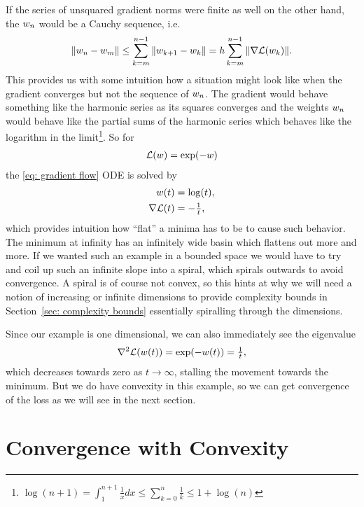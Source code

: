 If the series of unsquared gradient norms were finite as well on the other hand,
the \(w_n\) would be a Cauchy sequence, i.e.
%
\begin{align*}
	\|w_n - w_m \|
	\le \sum_{k=m}^{n-1} \|w_{k+1} - w_k\|
	= h \sum_{k=m}^{n-1} \|\nabla \mathcal{L}(w_k)\|.
\end{align*}
%
This provides us with some intuition how a situation might look like when the
gradient converges but not the sequence of \(w_n\). The gradient would
behave something like the harmonic series as its squares converges and the weights
\(w_n\) would behave like the partial sums of the harmonic series which
behaves like the logarithm in the limit\footnote{
\(
	\log(n+1) = \int_1^{n+1} \tfrac{1}x dx \le \sum_{k=0}^n \tfrac1k \le 1+ \log(n)
\)
}.
So for
%
\begin{align*}
	\mathcal{L}(w) = \exp(-w)
\end{align*}
%
the \ref{eq: gradient flow} ODE is solved by
%
\begin{align*}
	w(t) &= \log(t),\\
	\nabla \mathcal{L}(t) &= -\tfrac1t,
\end{align*}
%
which provides intuition how ``flat'' a minima has to be to cause such behavior.
The minimum at infinity has an infinitely wide basin which flattens out
more and more. If we wanted such an example in a bounded space we would have
to try and coil up such an infinite slope into a spiral, which spirals outwards
to avoid convergence. A spiral is of course not convex, so this hints
at why we will need a notion of increasing or infinite dimensions to
provide complexity bounds in Section~\ref{sec: complexity bounds} essentially
spiralling through the dimensions.

Since our example is one dimensional, we can also immediately see the eigenvalue
%
\begin{align*}
	\nabla^2 \mathcal{L}(w(t)) = \exp(-w(t)) = \tfrac1{t},
\end{align*}
%
which decreases towards zero as \(t\to\infty\), stalling the movement towards
the minimum. But we do have convexity in this example, so we can get convergence
of the loss as we will see in the next section.

\section{Convergence with Convexity}\label{sec: convex convergence theorems}

